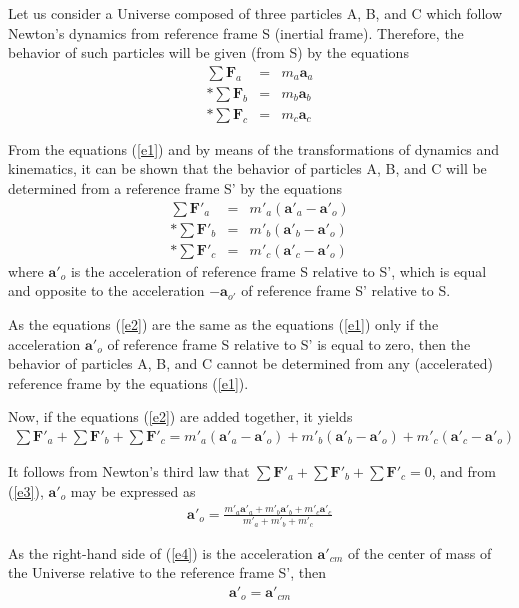 \documentclass[12pt]{article}
\newcommand{\vA}{\mathbf{a}}
\newcommand{\vF}{\mathbf{F}}
\newcommand{\mM}{m}
\newcommand{\rt}{'}
\newcommand{\ra}{_a}
\newcommand{\rb}{_b}
\newcommand{\rc}{_c}
\newcommand{\ro}{_o}
\newcommand{\rcm}{_{cm}}
\newcommand{\rot}{_{o'}}
\begin{document}
\par Let us consider a Universe composed of three particles A, B, and C which follow Newton's dynamics from reference frame S (inertial frame). Therefore, the behavior of such particles will be given (from S) by the equations
\begin{eqnarray}
\sum \vF\ra & = & \mM\ra\vA\ra \nonumber \\*
\sum \vF\rb & = & \mM\rb\vA\rb \label{e1} \\*
\sum \vF\rc & = & \mM\rc\vA\rc \nonumber
\end{eqnarray}
\par From the equations (\ref{e1}) and by means of the transformations of dynamics and kinematics, it can be shown that the behavior of particles A, B, and C will be determined from a reference frame S' by the equations
\begin{eqnarray}
\sum \vF\rt\ra & = & \mM\rt\ra(\vA\rt\ra - \vA\rt\ro) \nonumber \\*
\sum \vF\rt\rb & = & \mM\rt\rb(\vA\rt\rb - \vA\rt\ro) \label{e2} \\*
\sum \vF\rt\rc & = & \mM\rt\rc(\vA\rt\rc - \vA\rt\ro) \nonumber
\end{eqnarray}
\noindent where $\vA\rt\ro$ is the acceleration of reference frame S relative to S', which is equal and opposite to the acceleration $-\vA\rot$ of reference frame S' relative to S.
\par As the equations (\ref{e2}) are the same as the equations (\ref{e1}) only if the acceleration $\vA\rt\ro$ of reference frame S relative to S' is equal to zero, then the behavior of particles A, B, and C cannot be determined from any (accelerated) reference frame by the equations (\ref{e1}).
\par Now, if the equations (\ref{e2}) are added together, it yields
\begin{eqnarray}
\sum \vF\rt\ra + \sum \vF\rt\rb + \sum \vF\rt\rc = \mM\rt\ra(\vA\rt\ra - \vA\rt\ro) + \mM\rt\rb(\vA\rt\rb - \vA\rt\ro) + \mM\rt\rc(\vA\rt\rc - \vA\rt\ro) \label{e3}
\end{eqnarray}
\par It follows from Newton's third law that $\sum \vF\rt\ra + \sum \vF\rt\rb + \sum \vF\rt\rc = 0$, and from (\ref{e3}), $\vA\rt\ro$ may be expressed as
\begin{eqnarray}
\vA\rt\ro = \frac{\mM\rt\ra\vA\rt\ra + \mM\rt\rb\vA\rt\rb + \mM\rt\rc\vA\rt\rc}{\mM\rt\ra + \mM\rt\rb + \mM\rt\rc} \label{e4}
\end{eqnarray}
\par As the right-hand side of (\ref{e4}) is the acceleration $\vA\rt\rcm$ of the center of mass of the Universe relative to the reference frame S', then
\begin{eqnarray}
\vA\rt\ro = \vA\rt\rcm \label{e5}
\end{eqnarray}
\end{document}
